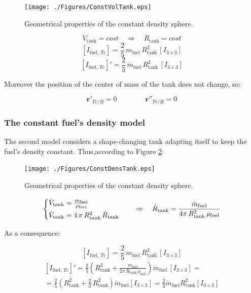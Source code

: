 \begin{figure}[h!]
	\centering
	\texttt{[image: ./Figures/ConstVolTank.eps]}
	\caption{Geometrical properties of the constant density sphere.}
	\label{fig:CostTankVol}
\end{figure}

\begin{equation}
	V_{\text{tank}}= cost \quad \Rightarrow \quad R_{\text{tank}} = cost
\end{equation}
\begin{equation}
	\left[I_{\text{fuel, }Tc}\right] = \frac{2}{5}\,m_{\text{fuel}} \,R_{\text{tank}}^2\, \left[I_{3\times3}\right]
\end{equation} 
\begin{equation}
	\left[I_{\text{fuel, }Tc}\right]' = \frac{2}{5}\,\dot{m}_{\text{fuel}} \,R_{\text{tank}}^2\, \left[I_{3\times3}\right]
\end{equation}

Moreover the position of the center of mass of the tank does not change, so:

\begin{equation}
	\bm{r}'_{Tc/B} = 0 \qquad\qquad \bm{r}''_{Tc/B}=0
\end{equation}
\subsubsection{The constant fuel's density model}
The second model considers a shape-changing tank adapting itself to keep the fuel's density constant. Thus,according to Figure \ref{fig:ConstDensTank}:
\begin{figure}[hb!]
	\centering
	\texttt{[image: ./Figures/ConstDensTank.eps]}
	\caption{Geometrical properties of the constant density sphere.}
	\label{fig:ConstDensTank}
\end{figure}
\begin{equation}
	\begin{cases}
		\dot{V}_{\text{tank}} = \frac{\dot{m}_{\text{fuel}}}{\rho_{\text{fuel}}} \vspace{3pt}\\
		\dot{V}_{\text{tank}} = 4\,\pi\,R_{\text{tank}}^2\,\dot{R}_{\text{tank}}
	\end{cases}
	\quad \Rightarrow \quad \dot{R}_{\text{tank}} = \frac{\dot{m}_{\text{fuel}}}{4\pi\,R_{\text{tank}}^2\,\rho_{\text{fuel}}}
\end{equation}

As a consequence:

\begin{equation}
	\left[I_{\text{fuel, }Tc}\right]= \frac{2}{5}\,m_{\text{fuel}} \,R_{\text{tank}}^2\, \left[I_{3\times3}\right]
\end{equation}
\begin{multline}
	\left[I_{\text{fuel, }Tc}\right]' =  \frac{2}{5}\left(R^2_{\text{tank}}+\frac{m_{\text{fuel}}}{2\pi\,R_{\text{tank}}\,\rho_{\text{fuel}}}\right)\dot{m}_{\text{fuel}}\,\left[I_{3\times3} \right] =\\
	= \frac{2}{5}\left(R^2_{\text{tank}} + \frac{2}{3}\,R^2_{\text{tank}}\right)\dot{m}_{\text{fuel}}\left[I_{3\times3}\right] = \frac{2}{3}\dot{m}_{\text{fuel}}R^2_{\text{tank}}\left[I_{3\times3}\right]
\end{multline}

